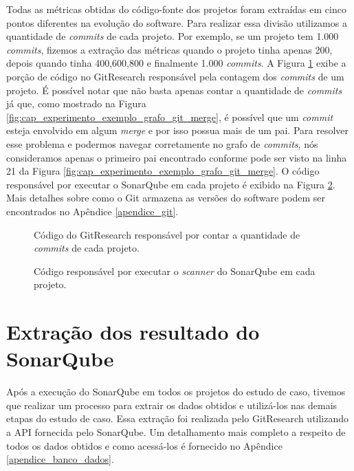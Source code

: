 Todas as métricas obtidas do código-fonte dos projetos foram extraídas em cinco pontos diferentes na evolução do software.  Para realizar essa divisão utilizamos a quantidade de \textit{commits} de cada projeto. Por exemplo, se um projeto tem 1.000 \textit{commits}, fizemos a extração das métricas quando o projeto tinha apenas 200, depois quando tinha 400,600,800 e finalmente 1.000 \textit{commits}.  A Figura \ref{fig:codigo_conta_commits} exibe a porção de código no GitResearch responsável pela contagem dos \textit{commits} de um projeto. É possível notar que não basta apenas contar a quantidade de \textit{commits} já que, como mostrado na Figura \ref{fig:cap_experimento_exemplo_grafo_git_merge}, é possível que um \textit{commit} esteja envolvido em algum \textit{merge} e por isso possua mais de um pai. Para resolver esse problema e podermos navegar corretamente no grafo de \textit{commits}, nós consideramos apenas o primeiro pai encontrado conforme pode ser visto na linha 21 da Figura \ref{fig:cap_experimento_exemplo_grafo_git_merge}. O código responsável por executar o SonarQube em cada projeto é exibido na Figura \ref{fig:codigo_executa_sonar}. Mais detalhes sobre como o Git armazena as versões do software podem ser encontrados no Apêndice \ref{apendice_git}.

 \begin{figure}[H]
  \centering
  \caption{Código do GitResearch responsável por contar a quantidade de \textit{commits} de cada projeto.}
  \label{fig:codigo_conta_commits} 
\end{figure}

 \begin{figure}[H]
  \centering
  \caption{Código responsável por executar o \textit{scanner} do SonarQube em cada projeto.}
  \label{fig:codigo_executa_sonar} 
\end{figure}

\section{Extração dos resultado do SonarQube}

Após a execução do SonarQube em todos os projetos do estudo de caso, tivemos que realizar um processo para extrair os dados obtidos e utilizá-los nas demais etapas do estudo de caso. Essa extração foi realizada pelo GitResearch utilizando a API fornecida pelo SonarQube. Um detalhamento mais completo a respeito de todos os dados obtidos e como acessá-los é fornecido no Apêndice \ref{apendice_banco_dados}.





